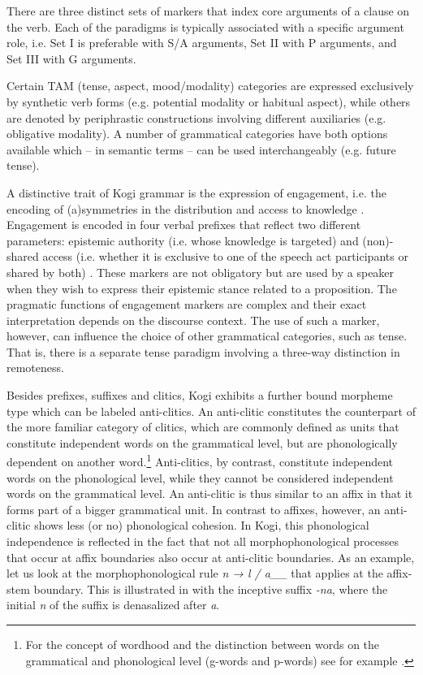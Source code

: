 \documentclass[output=paper,colorlinks,citecolor=brown]{langscibook}
\begin{document}
There are three distinct sets of markers that index core arguments of a clause on the verb. Each of the paradigms is typically associated with a specific argument role, i.e. Set I is preferable with S/A arguments, Set II with P arguments, and Set III with G arguments. 

Certain TAM (tense, aspect, mood/modality) categories are expressed exclusively by synthetic verb forms (e.g. potential modality or habitual aspect), while others are denoted by periphrastic constructions involving different auxiliaries (e.g. obligative modality). A number of grammatical categories have both options available which – in semantic terms – can be used interchangeably (e.g. future tense).

A distinctive trait of Kogi grammar is the expression of engagement, i.e. the encoding of (a)symmetries in the distribution and access to knowledge \citep{EvansEtAl2018}. Engagement is encoded in four verbal prefixes that reflect two different parameters: epistemic authority (i.e. whose knowledge is targeted) and (non)-shared access (i.e. whether it is exclusive to one of the speech act participants or shared by both) \citep{Bergqvist2016}. These markers are not obligatory but are used by a speaker when they wish to express their epistemic stance related to a proposition. The pragmatic functions of engagement markers are complex and their exact interpretation depends on the discourse context. The use of such a marker, however, can influence the choice of other grammatical categories, such as tense. That is, there is a separate tense paradigm involving a three-way distinction in remoteness. 

Besides prefixes, suffixes and clitics, Kogi exhibits a further bound morpheme type which can be labeled anti-clitics. An anti-clitic constitutes the counterpart of the more familiar category of clitics, which are commonly defined as units that constitute independent words on the grammatical level, but are phonologically dependent on another word.\footnote{For the concept of wordhood and the distinction between words on the grammatical and phonological level (g-words and p-words) see for example \citet{DixonAikhenvald2002}.} Anti-clitics, by contrast, constitute independent words on the phonological level, while they cannot be considered independent words on the grammatical level. An anti-clitic is thus similar to an affix in that it forms part of a bigger grammatical unit. In contrast to affixes, however, an anti-clitic shows less (or no) phonological cohesion. In Kogi, this phonological independence is reflected in the fact that not all morphophonological processes that occur at affix boundaries also occur at anti-clitic boundaries. As an example, let us look at the morphophonological rule \textit{n → l / a\_\_} that applies at the affix-stem boundary. This is illustrated in  with the inceptive suffix \textit{{}-na}, where the initial \textit{n} of the suffix is denasalized after \textit{a}. 
\end{document}
